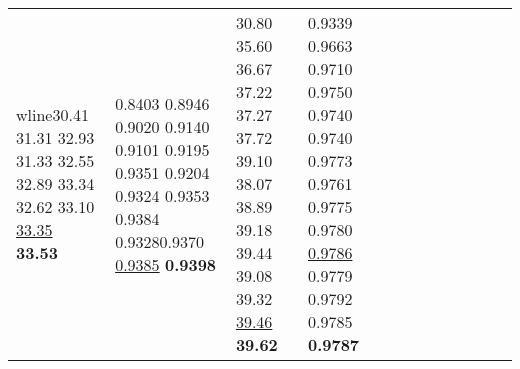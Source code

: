 \documentclass[runningheads]{llncs}
\begin{document}
\begin{table}[!ht]
\begin{tabular}{|p{7em}|p{2.5em}|p{2.5em}|p{3em}|p{2.5em}|p{3em}|p{2.5em}|p{3em}|p{2.5em}|p{3em}|p{2.5em}|p{3em}|}
wline{}30.41 \newline{}31.31 \newline{}32.93 \newline{}31.33 \newline{}32.55 \newline{}32.89 \newline{}33.34 \newline{}32.62 \newline{}33.10 \newline{}\underline{33.35} \newline{}\bfseries{33.53} & 0.8403 \newline{}0.8946 \newline{}0.9020 \newline{}0.9140 \newline{}0.9101 \newline{}0.9195 \newline{}0.9351 \newline{}0.9204 \newline{}0.9324 \newline{}0.9353 \newline{}0.9384 \newline{}0.9328\newline{}0.9370 \newline{}\underline{0.9385} \newline{}\bfseries{0.9398}  & 30.80 \newline{}35.60 \newline{}36.67 \newline{}37.22 \newline{}37.27 \newline{}37.72 \newline{}39.10 \newline{}38.07 \newline{}38.89 \newline{}39.18 \newline{}39.44 \newline{}39.08 \newline{}39.32 \newline{}\underline{39.46} \newline{}\bfseries{39.62} & 0.9339 \newline{}0.9663 \newline{}0.9710 \newline{}0.9750 \newline{}0.9740 \newline{}0.9740 \newline{}0.9773 \newline{}0.9761 \newline{}0.9775 \newline{}0.9780 \newline{}\underline{0.9786} \newline{}0.9779 \newline{}0.9792 \newline{}0.9785 \newline{}\bfseries{0.9787} \\

\end{tabular}
\end{table}
\end{document}
